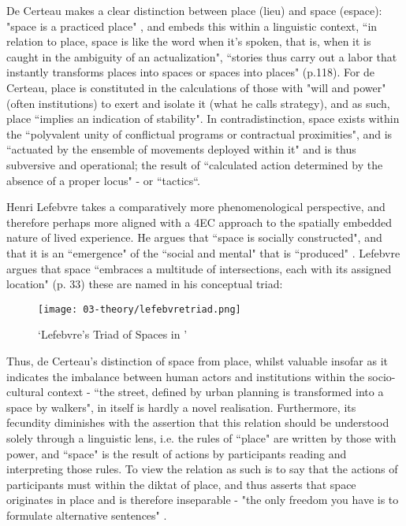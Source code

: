 De Certeau makes a clear distinction between place (lieu) and space (espace): "space is a practiced place"  \citeyearpar[p. 117]{decerteau1984}, and embeds this within a linguistic context, ``in relation to place, space is like the word when it's spoken, that is, when it is caught in the ambiguity of an actualization", ``stories thus carry out a labor that instantly transforms places into spaces or spaces into places" (p.118). For de Certeau, place is constituted in the calculations of those with "will and power" (often institutions) to exert and isolate it (what he calls strategy), and as such, place ``implies an indication of stability". In contradistinction, space exists within the ``polyvalent unity of conflictual programs or contractual proximities", and is ``actuated by the ensemble of movements deployed within it" and is thus subversive and operational; the result of ``calculated action determined by the absence of a proper locus" - or ``tactics``. 

Henri Lefebvre takes a comparatively more phenomenological perspective, and therefore perhaps more aligned with a 4EC approach to the spatially embedded nature of lived experience. He  argues that ``space is socially constructed", and that it is an ``emergence" of the ``social and mental" that is ``produced"  \citeyearpar[p. 260]{lefebvre1991}. Lefebvre argues that space ``embraces a multitude of intersections, each with its assigned location" (p. 33) these are named in his conceptual triad:

\begin{figure}[bth]
    \myfloatalign
    {\texttt{[image: 03-theory/lefebvretriad.png]}}
    \caption[`Lefebvre's Triad of Spaces in (Günzel, 2019, p.14)']{`Lefebvre's Triad of Spaces in \citep[p. 14]{gunzel2019}'}\label{fig: lefebvretriad}
\end{figure}

Thus, de Certeau's distinction of space from place, whilst valuable insofar as it indicates the imbalance between human actors and institutions within the socio-cultural context - ``the street, defined by urban planning is transformed into a space by walkers", in itself is hardly a novel realisation. Furthermore, its fecundity diminishes with the assertion that this relation should be understood solely through a linguistic lens, i.e. the rules of ``place" are written by those with power, and ``space" is the result of actions by participants reading and interpreting those rules. To view the relation as such is to say that the actions of participants must within the diktat of place, and thus asserts that space originates in place and is therefore inseparable - "the only freedom you have is to formulate alternative sentences" \citep{vermeulen2015}. 

